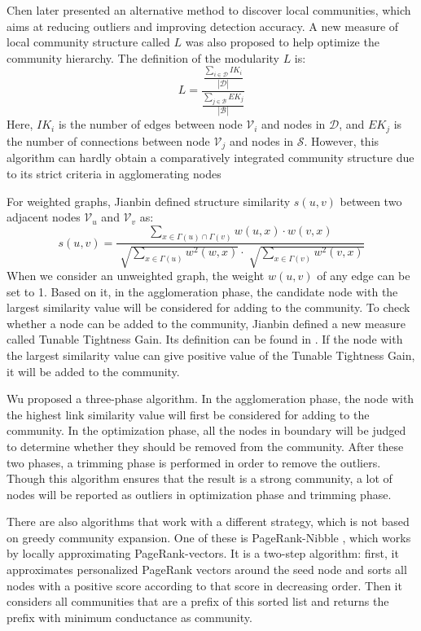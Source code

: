 \documentclass[\main/thesis.tex]{subfiles}
\begin{document}
Chen \cite{chen2009local} later presented an alternative method to discover local communities, which aims at reducing outliers and improving detection accuracy. A new measure of local community structure called $L$ was also proposed to help optimize the community hierarchy. The definition of the modularity $L$ is:
\begin{equation}
L=\frac{\frac{\sum_{i\in \mathcal{D}}IK_i}{|\mathcal{D}|}}{\frac{\sum_{j\in \mathcal{B}}EK_j}{|\mathcal{B}|}}
\end{equation}
Here, $IK_i$ is the number of edges between node $\mathcal{V}_i$ and nodes in $\mathcal{D}$, and $EK_j$ is the number of connections between node $\mathcal{V}_j$ and nodes in $\mathcal{S}$. However, this algorithm can hardly obtain a comparatively integrated community structure due to its strict criteria in agglomerating nodes

For weighted graphs, Jianbin \cite{huang2011towards} defined structure similarity $s(u,v)$ between two adjacent nodes $\mathcal{V}_u$ and $\mathcal{V}_v$ as:
\begin{equation}
s(u,v)=\frac{\sum_{x\in \Gamma(u)\cap\Gamma(v)}w(u,x)\cdot w(v,x)}{\sqrt[]{\sum_{x\in \Gamma(u)}w^2(w,x)}\cdot\sqrt[]{\sum_{x\in \Gamma(v)}w^2(v,x)}}
\end{equation}
When we consider an unweighted graph, the weight $w(u,v)$ of any edge can be set to 1. Based on it, in the agglomeration phase, the candidate node with the largest similarity value will be considered for adding to the community. To check whether a node can be added to the community, Jianbin defined a new measure called Tunable Tightness Gain. Its definition can be found in \cite{huang2011towards}. If the node with the largest similarity value can give positive value of the Tunable Tightness Gain, it will be added to the community.

Wu \cite{wu2012local} proposed a three-phase algorithm. In the agglomeration phase, the node with the highest link similarity value will first be considered for adding to the community. In the optimization phase, all the nodes in boundary will be judged to determine whether they should be removed from the community. After these two phases, a trimming phase is performed in order to remove the outliers. Though this algorithm ensures that the result is a strong community, a lot of nodes will be reported as outliers in optimization phase and trimming phase.

There are also algorithms that work with a different strategy, which is not based on greedy community expansion. One of these is PageRank-Nibble \cite{andersen2006local}, which works by locally approximating PageRank-vectors. It is a two-step algorithm: first, it approximates personalized PageRank vectors around the seed node and sorts all nodes with a positive score according to that score in decreasing order. Then it considers all communities that are a prefix of this sorted list and returns the prefix with minimum conductance as community.
\end{document}
